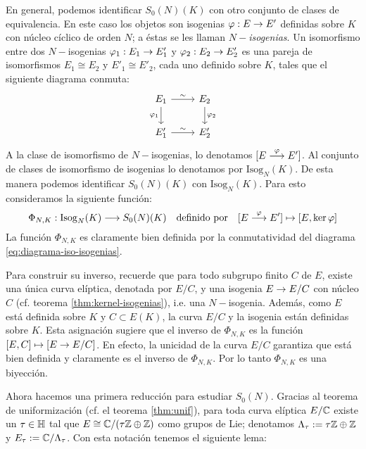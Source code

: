 \begin{nota}
En general, podemos identificar $S_0(N)(K)$ con otro conjunto de clases de equivalencia. En este caso los objetos son isogenias $\varphi:E\rightarrow E'$ definidas sobre $K$ con núcleo cíclico de orden $N$; a éstas se les llaman $N-$\emph{isogenias}. Un isomorfismo entre dos $N-$isogenias $\varphi_1:E_1\rightarrow E'_1$ y $\varphi_2:E_2\rightarrow E'_2$ es una pareja de isomorfismos $E_1\cong E_2$ y $E'_1\cong E'_2$, cada uno definido sobre $K$, tales que el siguiente diagrama conmuta:
\begin{equation}\label{eq:diagrama-iso-isogenias}
	\begin{tikzcd}
		E_1 \arrow[d,"\varphi_1"'] \arrow[r,"\sim"] & E_2 \arrow[d,"\varphi_2"]\\
		E'_1 \arrow[r,"\sim"] & E'_2
	\end{tikzcd}
\end{equation}
A la clase de isomorfismo de $N-$isogenias, lo denotamos $[E\overset{\varphi}{\longrightarrow} E']$. Al conjunto de clases de isomorfismo de isogenias lo denotamos por $\mathrm{Isog}_N(K)$. De esta manera podemos identificar $S_0(N)(K)$ con $\mathrm{Isog}_N(K)$. Para esto consideramos la siguiente función:
\begin{equation}\label{def:phi-N-K}
	\Phi_{N,K}:\mathrm{Isog}_N(K)\longrightarrow S_0(N)(K)\quad\text{definido por}\quad [E\overset{\varphi}{\longrightarrow} E']\mapsto [E,\ker\varphi]
\end{equation}
La función $\Phi_{N,K}$ es claramente bien definida por la conmutatividad del diagrama \eqref{eq:diagrama-iso-isogenias}.

Para construir su inverso, recuerde que para todo subgrupo finito $C$ de $E$, existe una única curva elíptica, denotada por $E/C$, y una isogenia $E\rightarrow E/C$ con núcleo $C$ (cf. teorema \ref{thm:kernel-isogenias}), i.e. una $N-$isogenia. Además, como $E$ está definida sobre $K$ y $C\subset E(K)$, la curva $E/C$ y la isogenia están definidas sobre $K$. Esta asignación sugiere que el inverso de $\Phi_{N,K}$ es la función $[E,C]\mapsto[E\rightarrow E/C]$. En efecto, la unicidad de la curva $E/C$ garantiza que está bien definida y claramente es el inverso de $\Phi_{N,K}$. Por lo tanto $\Phi_{N,K}$ es una biyección.
\end{nota}

Ahora hacemos una primera reducción para estudiar $S_0(N)$. Gracias al teorema de uniformización (cf. el teorema \ref{thm:unif}), para toda curva elíptica $E/\mathbb{C}$ existe un $\tau\in\mathbb{H}$ tal que $E\cong \mathbb{C}/(\tau\mathbb{Z}\oplus\mathbb{Z})$ como grupos de Lie; denotamos $\Lambda_\tau:=\tau\mathbb{Z}\oplus\mathbb{Z}$ y  $E_\tau:=\mathbb{C}/\Lambda_\tau$. Con esta notación tenemos el siguiente lema:

